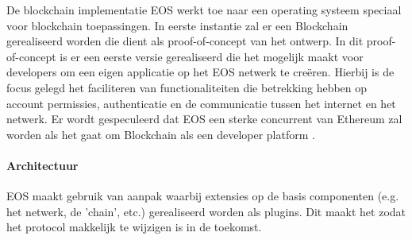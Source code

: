 De blockchain implementatie EOS werkt toe naar een operating systeem speciaal voor blockchain toepassingen. In eerste instantie zal er een Blockchain gerealiseerd worden die dient als proof-of-concept van het ontwerp. In dit proof-of-concept is er een eerste versie gerealiseerd die het mogelijk maakt voor developers om een eigen applicatie op het EOS netwerk te creëren. Hierbij is de focus gelegd het faciliteren van functionaliteiten die betrekking hebben op account permissies, authenticatie en de communicatie tussen het internet en het netwerk. Er wordt gespeculeerd dat EOS een sterke concurrent van Ethereum zal worden als het gaat om Blockchain als een developer platform \citep{steemit:eos}.

\paragraph{Architectuur}

EOS maakt gebruik van aanpak waarbij extensies op de basis componenten (e.g. het netwerk, de 'chain', etc.) gerealiseerd worden als plugins. Dit maakt het zodat het protocol makkelijk te wijzigen is in de toekomst. 

